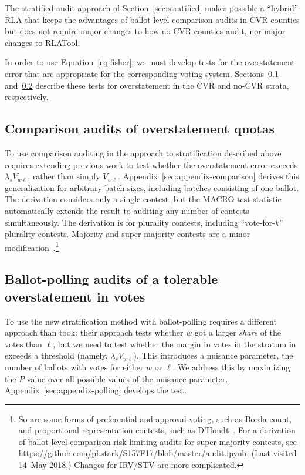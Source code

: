 \documentclass[runningheads]{llncs}
\begin{document}
The stratified audit approach of Section~\ref{sec:stratified} makes possible a ``hybrid'' RLA that keeps the advantages of ballot-level comparison audits in CVR counties but does not require major changes to how no-CVR counties audit, nor major changes to RLATool. 

In order to use Equation~\ref{eq:fisher}, we must develop tests for the overstatement error that are appropriate for the
corresponding voting system.
Sections~\ref{sec:comparisonError} and~\ref{sec:ballotPollError} describe these tests for overstatement in the CVR and no-CVR strata, respectively.

\subsection{Comparison audits of overstatement quotas}
\label{sec:comparisonError}

To use comparison auditing in the approach to stratification described above requires extending previous work to test whether the overstatement error exceeds $\lambda_s V_{w\ell}$, rather than simply $V_{w\ell}$.
Appendix~\ref{sec:appendix-comparison} derives this generalization for arbitrary batch sizes, including batches consisting of one ballot.
The derivation considers only a single contest, but the 
MACRO test statistic \cite{stark09c,stark10d} automatically extends the result to 
auditing any number of contests simultaneously.
The derivation is for plurality contests, including ``vote-for-$k$'' plurality contests.
Majority and super-majority contests are a minor 
modification~\cite{stark08a}.\footnote{%
  So are some forms of preferential and approval voting, such as Borda count, and
  proportional representation contests, such as D'Hondt~\cite{starkTeague14}.
  For a derivation of ballot-level comparison risk-limiting audits for super-majority contests, 
  see \url{https://github.com/pbstark/S157F17/blob/master/audit.ipynb}. (Last visited 14~May 2018.)
  Changes for IRV/STV are more complicated.
}

\subsection{Ballot-polling audits of a tolerable overstatement in votes}
\label{sec:ballotPollError}

To use the new stratification method with ballot-polling requires a different approach than \cite{lindemanEtal12} took: their approach tests whether $w$ got a larger \emph{share} of the votes than $\ell$, but we need to test whether the margin in votes in the stratum in exceeds a threshold (namely, $\lambda_s V_{w\ell}$).
This introduces a nuisance parameter, the number of ballots with votes for either $w$ or $\ell$.
We address this by maximizing the $P$-value over all possible values of the nuisance parameter.
Appendix~\ref{sec:appendix-polling} develops the test.
\end{document}
